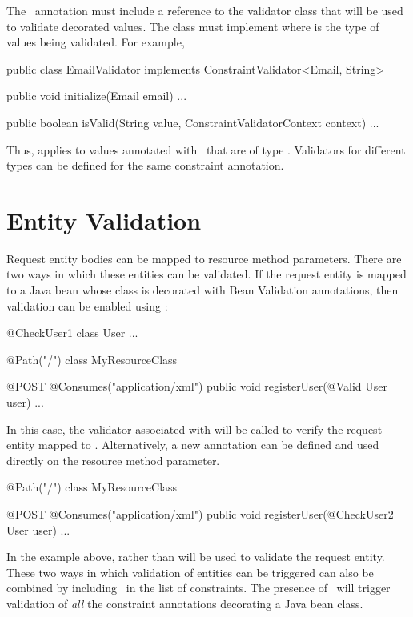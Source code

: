 The \Constraint\ annotation must include a reference to the validator class that will be used to validate decorated values. The  class must implement  where  is the type of values being validated. For example, 

\begin{listing}{1}
public class EmailValidator implements ConstraintValidator<Email, String> {
  public void initialize(Email email) { 
    ...
  }

  public boolean isValid(String value, ConstraintValidatorContext context) {
   ...
  }
}
\end{listing}

Thus,  applies to values annotated with \Email\ that are of type . Validators for different types can be defined for the same constraint annotation. 

\section{Entity Validation}

Request entity bodies can be mapped to resource method parameters. There are two ways in which these entities can be validated. If the request entity is mapped to a Java bean whose class is decorated with Bean Validation annotations, then validation can be enabled using \Valid:

\begin{listing}{1}
@CheckUser1
class User { ... }

@Path("/")
class MyResourceClass {

  @POST
  @Consumes("application/xml")
  public void registerUser(@Valid User user) {
    ...
  }
}
\end{listing}

In this case, the validator associated with  will be called to verify the request entity mapped to . Alternatively, a new annotation can be defined and used directly on the resource method parameter. 

\begin{listing}{1}
@Path("/")
class MyResourceClass {

  @POST
  @Consumes("application/xml")
  public void registerUser(@CheckUser2 User user) {
    ...
  }
}
\end{listing}

In the example above,  rather than  will be used to validate the request entity. These two ways in which validation of entities can be triggered can also be combined by including \Valid\ in the list of constraints. The presence of \Valid\ will trigger validation of \emph{all} the constraint annotations decorating a Java bean class.

